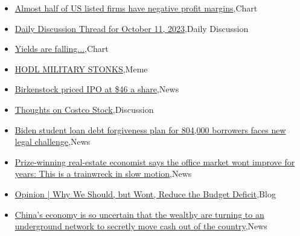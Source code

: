 \documentclass{article}%
\begin{document}
%
\begin{itemize}%
\item%
\href{https://reddit.com/r/wallstreetbets/comments/175aylw/almost\_half\_of\_us\_listed\_firms\_have\_negative/}{Almost half of US listed firms have negative profit margins},Chart%
\item%
\href{https://reddit.com/r/wallstreetbets/comments/175adcl/daily\_discussion\_thread\_for\_october\_11\_2023/}{Daily Discussion Thread for October 11, 2023},Daily Discussion%
\item%
\href{https://reddit.com/r/wallstreetbets/comments/1758mht/yields\_are\_falling/}{Yields are falling...},Chart%
\item%
\href{https://reddit.com/r/wallstreetbets/comments/17555iv/hodl\_military\_stonks/}{HODL MILITARY STONKS},Meme%
\item%
\href{https://reddit.com/r/StockMarket/comments/174wqpd/birkenstock\_priced\_ipo\_at\_46\_a\_share/}{Birkenstock priced IPO at \$46 a share},News%
\item%
\href{https://reddit.com/r/StockMarket/comments/174npkc/thoughts\_on\_costco\_stock/}{Thoughts on Costco Stock},Discussion%
\item%
\href{https://reddit.com/r/Economics/comments/17584kn/biden\_student\_loan\_debt\_forgiveness\_plan\_for/}{Biden student loan debt forgiveness plan for 804,000 borrowers faces new legal challenge},News%
\item%
\href{https://reddit.com/r/Economics/comments/1751126/prizewinning\_realestate\_economist\_says\_the\_office/}{Prize-winning real-estate economist says the office market wont improve for years: This is a trainwreck in slow motion},News%
\item%
\href{https://reddit.com/r/Economics/comments/174u6uo/opinion\_why\_we\_should\_but\_wont\_reduce\_the\_budget/}{Opinion | Why We Should, but Wont, Reduce the Budget Deficit},Blog%
\item%
\href{https://reddit.com/r/Economics/comments/174p36q/chinas\_economy\_is\_so\_uncertain\_that\_the\_wealthy/}{China's economy is so uncertain that the wealthy are turning to an underground network to secretly move cash out of the country},News%
\end{itemize}%
\end{document}
